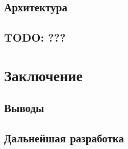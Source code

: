 \subsection{Архитектура}

\subsection{TODO: ???}

\newpage
\section{Заключение}

\subsection{Выводы}

\subsection{Дальнейшая разработка}
